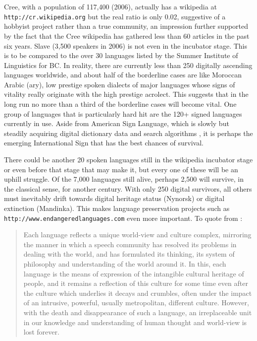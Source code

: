 \documentclass[10pt]{article}
\begin{document}
\noindent
Cree, with a population of 117,400 (2006), actually has a wikipedia at {\tt
  http://cr.wikipedia.org} but the real ratio is only 0.02, suggestive of a
hobbyist project rather than a true community, an impression further supported
by the fact that the Cree wikipedia has gathered less than 60 articles in the
past six years. Slave (3,500 speakers in 2006) is not even in the incubator
stage. This is to be compared to the over 30 languages listed by the Summer
Institute of Linguistics for BC.  In reality, there are currently less than
250 digitally ascending languages worldwide, and {\color{black} about half of
  the borderline cases are like Moroccan Arabic (ary), low prestige spoken
  dialects of major languages whose signs of vitality really originate with
  the high prestige acrolect. This suggests that in the long run no more} than
a third of the borderline cases will become vital. One group of languages that
is particularly hard hit are the 120+ signed languages currently in use. Aside
from American Sign Language, which is slowly but steadily acquiring digital
dictionary data and search algorithms \cite{Thangali:2011},
it is perhaps the emerging International Sign \cite{Hiddinga:2011}
that has the best chances of survival. 

There could be another 20 spoken languages still in the wikipedia incubator
stage or even before that stage that may make it, but every one of these will
be an uphill struggle.  Of the 7,000 languages still alive, perhaps 2,500 will
survive, in the classical sense, for another century. With only 250 digital
survivors, all others must inevitably drift towards digital heritage status
(Nynorsk) or digital extinction (Mandinka). This makes language preservation
projects such as {\tt http://www.endangeredlanguages.com} even more
important. To quote from \cite{UN_biodiv:2004}:

\begin{quote}
Each language reflects a unique world-view and culture complex, mirroring the
manner in which a speech community has resolved its problems in dealing with
the world, and has formulated its thinking, its system of philosophy and
understanding of the world around it.  In this, each language is the means of
expression of the intangible cultural heritage of people, and it remains a
reflection of this culture for some time even after the culture which
underlies it decays and crumbles, often under the impact of an intrusive,
powerful, usually metropolitan, different culture.  However, with the death
and disappearance of such a language, an irreplaceable unit in our knowledge
and understanding of human thought and world-view is lost forever.
\end{quote}
\end{document}
